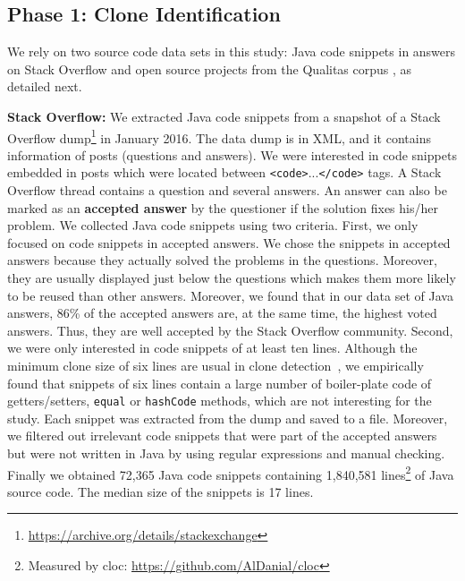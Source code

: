 \documentclass[10pt,journal,compsoc]{IEEEtran}
\begin{document}
\subsection{Phase 1: Clone Identification}

We rely on two source code data sets in this study: Java code snippets in answers
on Stack Overflow and open source projects from the Qualitas corpus
\cite{QualitasCorpus}, as detailed next.

\textbf{Stack Overflow:} We extracted Java code snippets from a snapshot of a
Stack Overflow dump\footnote{\url{https://archive.org/details/stackexchange}} in
January 2016. %
The data dump is in XML, and it contains information of posts (questions and
answers). We were interested in code snippets embedded in posts which were
located between {\small\texttt{<code>}...\texttt{</code>}} tags. A Stack
Overflow thread contains a question and several answers. An answer can also be
marked as an \textbf{accepted answer} by the questioner if the solution fixes
his/her problem. We collected Java code snippets using two criteria. First, we
only focused on code snippets in accepted answers. We chose the snippets in
accepted answers because they actually solved the problems in the questions.
Moreover, they are usually displayed just below the questions which makes them
more likely to be reused than other answers. Moreover, we found that in our data set
of Java answers, 86\% of the accepted answers are, at the same time, the highest voted
answers. Thus, they are well accepted by the Stack Overflow community.
Second, we were only interested in
code snippets of at least ten lines. Although the minimum clone size of six
lines are usual in clone detection~\cite{Bellon2007,Wang2013,Koschke2006}, we
empirically found that snippets of six lines contain a large number of
boiler-plate code of getters/setters, \texttt{equal} or \texttt{hashCode}
methods, which are not interesting for the study. Each snippet was extracted
from the dump and saved to a file. Moreover, we filtered out irrelevant code
snippets that were part of the accepted answers but were not written in Java by
using regular expressions and manual checking.
Finally we obtained 72,365 Java code snippets containing 1,840,581
lines\footnote{Measured by cloc: \url{https://github.com/AlDanial/cloc}} of Java
source code. The median size of the snippets is 17 lines.
\end{document}
